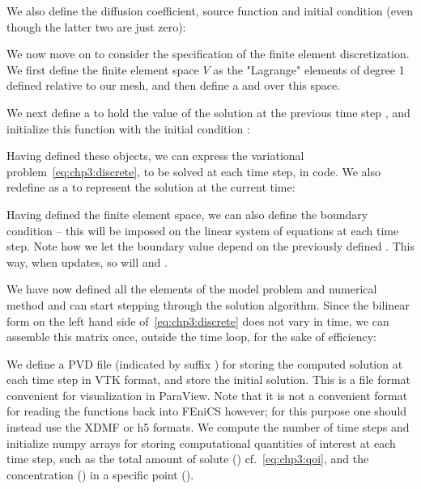 \noindent We also define the diffusion coefficient, source function
and initial condition (even though the latter two are just zero):

We now move on to consider the specification of the finite element
discretization. We first define the finite element space $V$ as the
"Lagrange" elements of degree 1 defined relative to our mesh, and then
define a  and 
over this space. 

\noindent We next define a  to hold the value
of the solution at the previous time step , and
initialize this function with the initial condition :

\noindent Having defined these objects, we can express the variational
problem~\eqref{eq:chp3:discrete}, to be solved at each time step, in
code. We also redefine  as a
 to represent the solution at the current time:

\noindent Having defined the finite element space, we can also define
the boundary condition -- this will be imposed on the linear system of
equations at each time step. Note how we let the boundary value
 depend on the previously defined
 . This way, when
 updates, so will  and
.

We have now defined all the elements of the model problem and
numerical method and can start stepping through the solution
algorithm. Since the bilinear form on the left hand side
of~\eqref{eq:chp3:discrete} does not vary in time, we can assemble
this matrix once, outside the time loop, for the sake of efficiency:  

We define a PVD file (indicated by suffix ) for
storing the computed solution at each time step in VTK format, and
store the initial solution. This is a file format convenient for
visualization in ParaView. Note that it is not a convenient format for
reading the functions back into FEniCS however; for this purpose one
should instead use the XDMF or h5 formats.
 We compute
the number of time steps  and initialize numpy arrays
for storing computational quantities of interest at each time step,
such as the total amount of solute ()
cf.~\eqref{eq:chp3:qoi}, and the concentration ()
in a specific point ().

